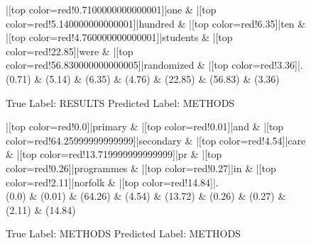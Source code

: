 \documentclass[a4paper, landscape]{article}
\begin{document}
\clearpage
\begin{figure}
\begin{center}
\begin{dependency}
\begin{deptext}
|[top color=red!0.7100000000000001]|one \& |[top color=red!5.140000000000001]|hundred \& |[top color=red!6.35]|ten \& |[top color=red!4.760000000000001]|students \& |[top color=red!22.85]|were \& |[top color=red!56.830000000000005]|randomized \& |[top color=red!3.36]|.\\
(0.71) \& (5.14) \& (6.35) \& (4.76) \& (22.85) \& (56.83) \& (3.36)\\
\end{deptext}
\end{dependency}
\end{center}
\caption{True Label: RESULTS Predicted Label: METHODS}
\end{figure}
\clearpage
\begin{figure}
\begin{center}
\begin{dependency}
\begin{deptext}
|[top color=red!0.0]|primary \& |[top color=red!0.01]|and \& |[top color=red!64.25999999999999]|secondary \& |[top color=red!4.54]|care \& |[top color=red!13.719999999999999]|pr \& |[top color=red!0.26]|programmes \& |[top color=red!0.27]|in \& |[top color=red!2.11]|norfolk \& |[top color=red!14.84]|.\\
(0.0) \& (0.01) \& (64.26) \& (4.54) \& (13.72) \& (0.26) \& (0.27) \& (2.11) \& (14.84)\\
\end{deptext}
\end{dependency}
\end{center}
\caption{True Label: METHODS Predicted Label: METHODS}
\end{figure}
\clearpage
\end{document}
